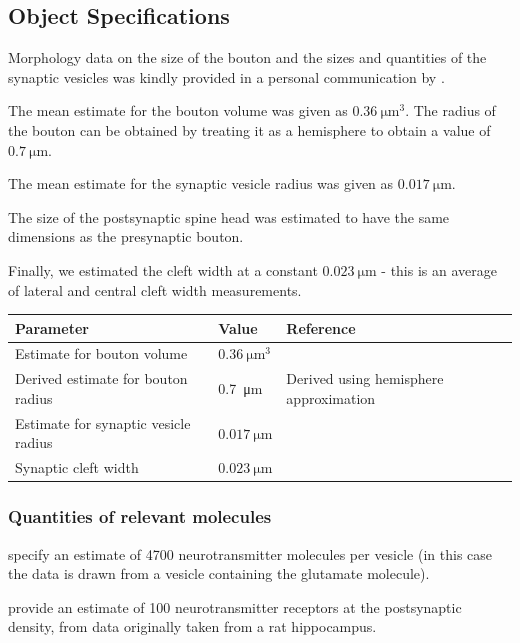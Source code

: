 \documentclass[a4paper]{article}
\begin{document}
\subsection{Object Specifications}
Morphology data on the size of the bouton and the sizes and quantities of the synaptic vesicles was kindly provided in a personal communication by \cite{Rollehagen::2015}. 

The mean estimate for the bouton volume was given as $\SI{0.36}{\micro\meter\cubed}$. The radius of the bouton can be obtained by treating it as a hemisphere to obtain a value of $\SI{0.7}{\micro\metre}$. 

The mean estimate for the synaptic vesicle radius was given as $\SI{0.017}{\micro\meter}$.

The size of the postsynaptic spine head was estimated to have the same dimensions as the presynaptic bouton.

Finally, we estimated the cleft width at a constant $\SI{0.023}{\micro\meter}$ - this is an average of lateral and central cleft width measurements.

\begin{table}[H]
\begin{tabular}{lll}
Parameter & Value & Reference \\ \hline
Estimate for bouton volume&  $\SI{0.36}{\micro\meter\cubed}$& \cite{Rollehagen::2015} \\ 
Derived estimate for bouton radius & \SI{0.7}{\micro\meter} & Derived using hemisphere approximation\\
Estimate for synaptic vesicle radius & $\SI{0.017}{\micro\meter}$ & \cite{Rollehagen::2015}\\ 
Synaptic cleft width &$\SI{0.023}{\micro\meter}$& \cite{Rollehagen::2015}\\
\end{tabular}
\end{table}

\subsubsection{Quantities of relevant molecules}
\cite{Bruns:Nature:1995} specify an estimate of 4700 neurotransmitter molecules per vesicle (in this case the data is drawn from a vesicle containing the glutamate molecule).

\cite{Stricker:JPhysiol:1996} provide an estimate of 100 neurotransmitter receptors at the postsynaptic density, from data originally taken from a rat hippocampus.
\end{document}
